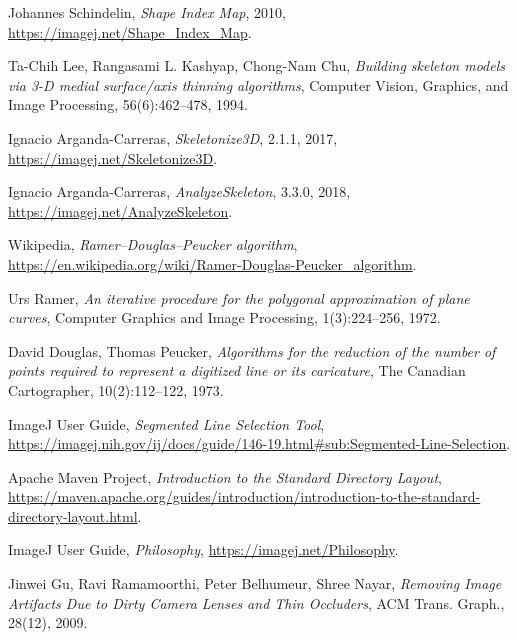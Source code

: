 \documentclass[declaration,shortabstract,mgr]{iithesis}
\begin{document}
\begin{thebibliography}{1}
  Johannes Schindelin,
  \emph{Shape Index Map},
  2010,
  \url{https://imagej.net/Shape_Index_Map}.

  Ta-Chih Lee, Rangasami L. Kashyap, Chong-Nam Chu,
  \emph{Building skeleton models via 3-D medial surface/axis thinning algorithms},
  Computer Vision, Graphics, and Image Processing,
  56(6):462--478,
  1994.

  Ignacio Arganda-Carreras,
  \emph{Skeletonize3D},
  2.1.1,
  2017,
  \url{https://imagej.net/Skeletonize3D}.

  Ignacio Arganda-Carreras,
  \emph{AnalyzeSkeleton},
  3.3.0,
  2018,
  \url{https://imagej.net/AnalyzeSkeleton}.
  
  Wikipedia,
  \emph{Ramer--Douglas--Peucker algorithm},
  \url{https://en.wikipedia.org/wiki/Ramer-Douglas-Peucker_algorithm}.

  Urs Ramer,
  \emph{An iterative procedure for the polygonal approximation of plane curves},
  Computer Graphics and Image Processing,
  1(3):224–256,
  1972.

  David Douglas, Thomas Peucker,
  \emph{Algorithms for the reduction of the number of points required to represent a digitized line or its caricature},
  The Canadian Cartographer,
  10(2):112–122,
  1973.
  
  ImageJ User Guide,
  \emph{Segmented Line Selection Tool},
  \url{https://imagej.nih.gov/ij/docs/guide/146-19.html#sub:Segmented-Line-Selection}.
  
  Apache Maven Project,
  \emph{Introduction to the Standard Directory Layout},
  \url{https://maven.apache.org/guides/introduction/introduction-to-the-standard-directory-layout.html}.

  ImageJ User Guide,
  \emph{Philosophy},
  \url{https://imagej.net/Philosophy}.

  Jinwei Gu, Ravi Ramamoorthi, Peter Belhumeur, Shree Nayar,
  \emph{Removing Image Artifacts Due to Dirty Camera Lenses and Thin Occluders},
  ACM Trans. Graph.,
  28(12),
  2009.

\end{thebibliography}
\end{document}
